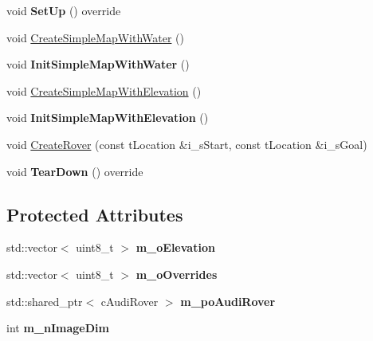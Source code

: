 \begin{DoxyCompactItemize}
\mbox{\label{classc_planner_test_a88ad8b0e63c66a9d94c7606aa67ef20d}} 
void {\bfseries Set\+Up} () override
\item 
void \mbox{\hyperlink{classc_planner_test_a1e8b184185494cae8444fb7d5f846334}{Create\+Simple\+Map\+With\+Water}} ()
\item 
\mbox{\label{classc_planner_test_aa55c78961deacf34543933e12cd82000}} 
void {\bfseries Init\+Simple\+Map\+With\+Water} ()
\item 
void \mbox{\hyperlink{classc_planner_test_a3d08d274ae12fbecd664ec70b4d6dfa3}{Create\+Simple\+Map\+With\+Elevation}} ()
\item 
\mbox{\label{classc_planner_test_a59339eef13103205b18ab2f1b1f59d7e}} 
void {\bfseries Init\+Simple\+Map\+With\+Elevation} ()
\item 
void \mbox{\hyperlink{classc_planner_test_adc6dedb45d227191f0c87843a182d802}{Create\+Rover}} (const t\+Location \&i\+\_\+s\+Start, const t\+Location \&i\+\_\+s\+Goal)
\item 
\mbox{\label{classc_planner_test_ae7db6ebf867e3ba6bf8adaaca636f064}} 
void {\bfseries Tear\+Down} () override
\end{DoxyCompactItemize}
\subsection*{Protected Attributes}
\begin{DoxyCompactItemize}
\item 
\mbox{\label{classc_planner_test_a2c83ae3b350736b9005788134eb023e2}} 
std\+::vector$<$ uint8\+\_\+t $>$ {\bfseries m\+\_\+o\+Elevation}
\item 
\mbox{\label{classc_planner_test_a30d78247a35a834582a09a4b9585b28a}} 
std\+::vector$<$ uint8\+\_\+t $>$ {\bfseries m\+\_\+o\+Overrides}
\item 
\mbox{\label{classc_planner_test_a15fb3c0b9281c70b51654f88799c0c07}} 
std\+::shared\+\_\+ptr$<$ c\+Audi\+Rover $>$ {\bfseries m\+\_\+po\+Audi\+Rover}
\item 
\mbox{\label{classc_planner_test_a1d1e9b95d362b2f8488c988e9f05583b}} 
int {\bfseries m\+\_\+n\+Image\+Dim}
\end{DoxyCompactItemize}
